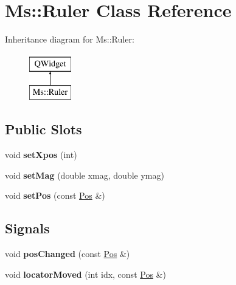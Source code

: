 \hypertarget{class_ms_1_1_ruler}{}\section{Ms\+:\+:Ruler Class Reference}
\label{class_ms_1_1_ruler}
Inheritance diagram for Ms\+:\+:Ruler\+:\begin{figure}[H]
\begin{center}
\leavevmode
\includegraphics[height=2.000000cm]{class_ms_1_1_ruler}
\end{center}
\end{figure}
\subsection*{Public Slots}
\begin{DoxyCompactItemize}
\item 
\mbox{\label{class_ms_1_1_ruler_aec3b33c194817ddd942c577cf204d475}} 
void {\bfseries set\+Xpos} (int)
\item 
\mbox{\label{class_ms_1_1_ruler_ae3dbd4501352a877974438410ec16824}} 
void {\bfseries set\+Mag} (double xmag, double ymag)
\item 
\mbox{\label{class_ms_1_1_ruler_a21fe22423b06242a6467c5d064a01196}} 
void {\bfseries set\+Pos} (const \hyperlink{class_ms_1_1_pos}{Pos} \&)
\end{DoxyCompactItemize}
\subsection*{Signals}
\begin{DoxyCompactItemize}
\item 
\mbox{\label{class_ms_1_1_ruler_a46670c9e1c1677611329fd688bfe011f}} 
void {\bfseries pos\+Changed} (const \hyperlink{class_ms_1_1_pos}{Pos} \&)
\item 
\mbox{\label{class_ms_1_1_ruler_addcf1596ca263f36b09e445e2c308033}} 
void {\bfseries locator\+Moved} (int idx, const \hyperlink{class_ms_1_1_pos}{Pos} \&)
\end{DoxyCompactItemize}
